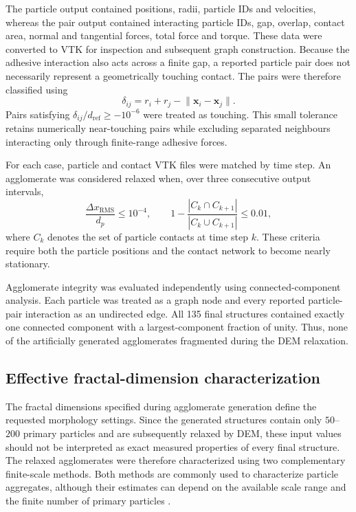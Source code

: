 \documentclass[12pt,a4paper]{article}
\begin{document}
The particle output contained positions, radii, particle IDs and velocities,
whereas the pair output contained interacting particle IDs, gap, overlap,
contact area, normal and tangential forces, total force and torque. These data
were converted to VTK for inspection and subsequent graph construction.
Because the adhesive interaction also acts across a finite gap, a reported
particle pair does not necessarily represent a geometrically touching contact.
The pairs were therefore classified using
\begin{equation}
	\delta_{ij}
	=r_i+r_j-\lVert\boldsymbol{x}_i-\boldsymbol{x}_j\rVert .
\end{equation}
Pairs satisfying
$\delta_{ij}/d_{\mathrm{ref}}\geq-10^{-6}$ were treated as touching. This small
tolerance retains numerically near-touching pairs while excluding separated
neighbours interacting only through finite-range adhesive forces.

For each case, particle and contact VTK files were matched by time step. An
agglomerate was considered relaxed when, over three consecutive output
intervals,
\begin{equation}
	\frac{\Delta x_{\mathrm{RMS}}}{d_p}\leq10^{-4},
	\qquad
	1-\frac{|C_k\cap C_{k+1}|}{|C_k\cup C_{k+1}|}\leq0.01,
\end{equation}
where $C_k$ denotes the set of particle contacts at time step $k$. These
criteria require both the particle positions and the contact network to become
nearly stationary.

Agglomerate integrity was evaluated independently using connected-component
analysis. Each particle was treated as a graph node and every reported
particle-pair interaction as an undirected edge. All 135 final structures
contained exactly one connected component with a largest-component fraction of
unity. Thus, none of the artificially generated agglomerates fragmented during
the DEM relaxation.

\subsection{Effective fractal-dimension characterization}
\label{sec:measured_fractal_dimension}

The fractal dimensions specified during agglomerate generation define the
requested morphology settings. Since the generated structures contain only
\(50\)--\(200\) primary particles and are subsequently relaxed by DEM, these
input values should not be interpreted as exact measured properties of every
final structure. The relaxed agglomerates were therefore characterized using
two complementary finite-scale methods. Both methods are commonly used to
characterize particle aggregates, although their estimates can depend on the
available scale range and the finite number of primary particles
\cite{Bushell2002,Theiler1990}.
\end{document}
